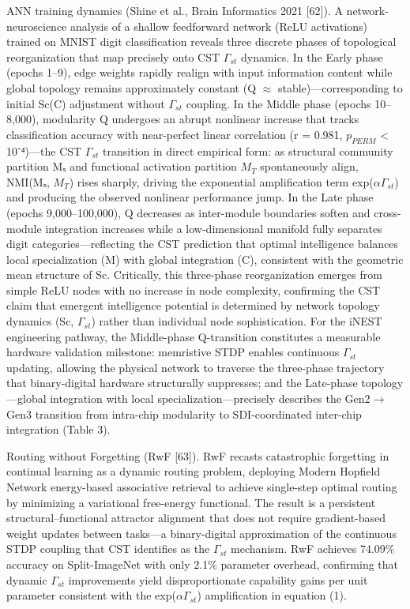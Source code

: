\documentclass[a4paper,12pt]{article}
\begin{document}
ANN training dynamics (Shine et al., Brain Informatics 2021 [62]). A network-neuroscience analysis of a shallow feedforward network (ReLU activations) trained on MNIST digit classification reveals three discrete phases of topological reorganization that map precisely onto CST $\Gamma_{st}$ dynamics. In the Early phase (epochs 1--9), edge weights rapidly realign with input information content while global topology remains approximately constant (Q $\approx$ stable)---corresponding to initial Sc(C) adjustment without $\Gamma_{st}$ coupling. In the Middle phase (epochs 10--8,000), modularity Q undergoes an abrupt nonlinear increase that tracks classification accuracy with near-perfect linear correlation (r = 0.981, $p_{PERM}$ < 10⁻⁴)---the CST $\Gamma_{st}$ transition in direct empirical form: as structural community partition Mₛ and functional activation partition $M_{T}$ spontaneously align, NMI(Mₛ, $M_{T}$) rises sharply, driving the exponential amplification term exp($\alpha$\cdot$\Gamma_{st}$) and producing the observed nonlinear performance jump. In the Late phase (epochs 9,000--100,000), Q decreases as inter-module boundaries soften and cross-module integration increases while a low-dimensional manifold fully separates digit categories---reflecting the CST prediction that optimal intelligence balances local specialization (M) with global integration (C), consistent with the geometric mean structure of Sc. Critically, this three-phase reorganization emerges from simple ReLU nodes with no increase in node complexity, confirming the CST claim that emergent intelligence potential is determined by network topology dynamics (Sc, $\Gamma_{st}$) rather than individual node sophistication. For the iNEST engineering pathway, the Middle-phase Q-transition constitutes a measurable hardware validation milestone: memristive STDP enables continuous $\Gamma_{st}$ updating, allowing the physical network to traverse the three-phase trajectory that binary-digital hardware structurally suppresses; and the Late-phase topology---global integration with local specialization---precisely describes the Gen2$\rightarrow$Gen3 transition from intra-chip modularity to SDI-coordinated inter-chip integration (Table 3).


Routing without Forgetting (RwF [63]). RwF recasts catastrophic forgetting in continual learning as a dynamic routing problem, deploying Modern Hopfield Network energy-based associative retrieval to achieve single-step optimal routing by minimizing a variational free-energy functional. The result is a persistent structural--functional attractor alignment that does not require gradient-based weight updates between tasks---a binary-digital approximation of the continuous STDP coupling that CST identifies as the $\Gamma_{st}$ mechanism. RwF achieves 74.09\% accuracy on Split-ImageNet with only 2.1\% parameter overhead, confirming that dynamic $\Gamma_{st}$ improvements yield disproportionate capability gains per unit parameter consistent with the exp($\alpha$\cdot$\Gamma_{st}$) amplification in equation (1).
\end{document}
